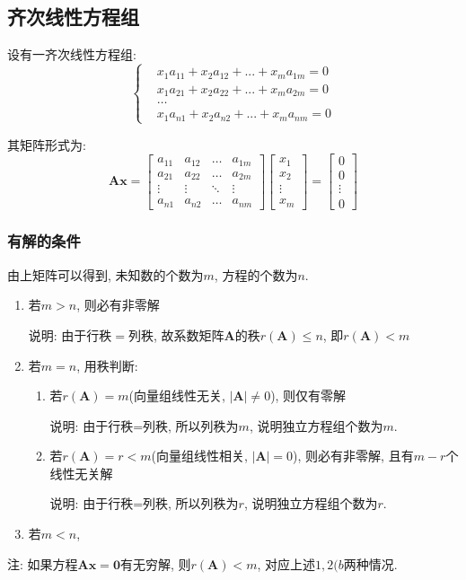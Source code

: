 \subsection{齐次线性方程组}
设有一齐次线性方程组:
\begin{equation*}
\left\{
\begin{aligned}
& x_{1}a_{11}+x_{2}a_{12}+...+x_{m}a_{1m}=0 \\
& x_{1}a_{21}+x_{2}a_{22}+...+x_{m}a_{2m}=0 \\
& \dots \\
& x_{1}a_{n1}+x_{2}a_{n2}+...+x_{m}a_{nm}=0
\end{aligned}
\right.
\end{equation*}\par
其矩阵形式为:
\begin{equation*}
\bm{A}\bm{x}=
\begin{bmatrix}
a_{11} & a_{12} & \dots & a_{1m} \\
a_{21} & a_{22} & \dots & a_{2m} \\
\vdots & \vdots & \ddots & \vdots \\
a_{n1} & a_{n2} & \dots & a_{nm}
\end{bmatrix}
\begin{bmatrix}
x_{1} \\
x_{2} \\
\vdots \\
x_{m}
\end{bmatrix}=
\begin{bmatrix}
0 \\
0 \\
\vdots \\
0
\end{bmatrix}
\end{equation*}
\subsubsection{有解的条件}
由上矩阵可以得到, 未知数的个数为$ m $, 方程的个数为$ n $.
\begin{enumerate}
\item 若$ m>n $, 则必有非零解 \par
说明: 由于行秩$ = $列秩, 故系数矩阵$ \bm{A} $的秩$ r(\bm{A})\le n $, 即$ r(\bm{A})<m $
\item 若$ m=n $, 用秩判断:
\begin{enumerate}
\item 若$ r(\bm{A})=m $(向量组线性无关, $ |\bm{A}|\neq 0 $), 则仅有零解 \par
说明: 由于行秩=列秩, 所以列秩为$ m $, 说明独立方程组个数为$ m $.
\item 若$ r(\bm{A})=r<m $(向量组线性相关, $ |\bm{A}| = 0 $), 则必有非零解, 且有$ m-r $个线性无关解 \par
说明: 由于行秩=列秩, 所以列秩为$ r $, 说明独立方程组个数为$ r $.
\end{enumerate}
\item 若$ m<n $,
\end{enumerate}\par 
注: 如果方程$ \bm{A}\bm{x}=\bm{0} $有无穷解, 则$ r(\bm{A})<m $, 对应上述$ 1,2(b $两种情况.
